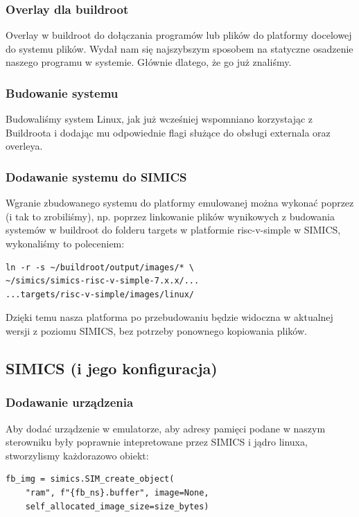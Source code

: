 \documentclass[../main.tex]{subfiles}
\begin{document}
\subsubsection{Overlay dla buildroot}
Overlay w buildroot do dołączania programów lub plików do platformy docelowej do systemu plików. Wydał nam się najszybszym sposobem na statyczne osadzenie naszego programu w systemie. Głównie dlatego, że go już znaliśmy.

\subsubsection{Budowanie systemu}
Budowaliśmy system Linux, jak już wcześniej wspomniano korzystając z Buildroota i dodając mu odpowiednie flagi służące do obsługi externala oraz overleya.

\subsubsection{Dodawanie systemu do SIMICS}
Wgranie zbudowanego systemu do platformy emulowanej można wykonać poprzez (i tak to zrobiliśmy), np. poprzez linkowanie plików wynikowych z budowania systemów w buildroot do folderu targets w platformie risc-v-simple w SIMICS, wykonaliśmy to poleceniem:
	\begin{listing}
		\begin{verbatim}
ln -r -s ~/buildroot/output/images/* \
~/simics/simics-risc-v-simple-7.x.x/...
...targets/risc-v-simple/images/linux/
		\end{verbatim}
	\end{listing}
Dzięki temu nasza platforma po przebudowaniu będzie widoczna w aktualnej wersji z poziomu SIMICS, bez potrzeby ponownego kopiowania plików.



\subsection{SIMICS (i jego konfiguracja)}
\subsubsection{Dodawanie urządzenia}
Aby dodać urządzenie w emulatorze, aby adresy pamięci podane w naszym sterowniku były poprawnie intepretowane przez SIMICS i jądro linuxa, stworzylismy każdorazowo obiekt:
	\begin{listing}
		\begin{verbatim}
fb_img = simics.SIM_create_object(
	"ram", f"{fb_ns}.buffer", image=None,
	self_allocated_image_size=size_bytes)
		\end{verbatim}
	\end{listing}
\end{document}
